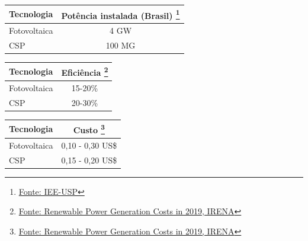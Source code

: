 \documentclass[12pt,notheorems,hyperref={pdfauthor= Rafael Nardi}]{beamer}
\begin{document}
\begin{frame}%

	\begin{table}
		\begin{tabular}{lc}
			\toprule
			Tecnologia & Potência instalada (Brasil) \footnote{\href{https://www.iee.usp.br/}{Fonte: IEE-USP}}\\
			\midrule
			Fotovoltaica & 4 GW  \\
			CSP &  100 MG  \\
			\bottomrule
		\end{tabular}		
		
	\end{table}
	
\end{frame}

\begin{frame}%

	\begin{table} 
		\begin{tabular}{lc}
			\toprule
			Tecnologia & Eficiência  \footnote{\href{https://resources.solarbusinesshub.com/solar-industry-reports/item/renewable-power-generation-costs-in-2019}{Fonte: Renewable Power Generation Costs in 2019, IRENA}}\\
			\midrule
			Fotovoltaica & 15-20\% \\
			CSP & 20-30\% \\
			\bottomrule
		\end{tabular}
	\end{table}
	
\end{frame}

\begin{frame}%

	\begin{table}
		\begin{tabular}{lc}
			\toprule
			Tecnologia & Custo \footnote{\href{https://resources.solarbusinesshub.com/solar-industry-reports/item/renewable-power-generation-costs-in-2019}{Fonte: Renewable Power Generation Costs in 2019, IRENA}}\\
			\midrule
			Fotovoltaica & 0,10 - 0,30 US\$ \\
			CSP & 0,15 - 0,20 US\$ \\
			\bottomrule
		\end{tabular}
	\end{table}
	
\end{frame}
\end{document}
